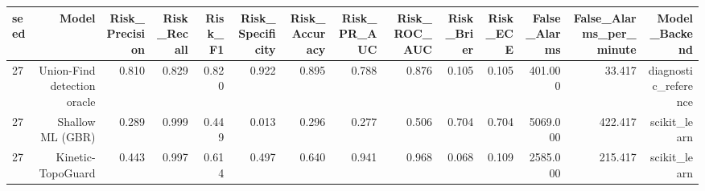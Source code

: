 \begin{tabular}{lrrrrrrrrrrrrr}
\toprule
seed & Model & Risk\_Precision & Risk\_Recall & Risk\_F1 & Risk\_Specificity & Risk\_Accuracy & Risk\_PR\_AUC & Risk\_ROC\_AUC & Risk\_Brier & Risk\_ECE & False\_Alarms & False\_Alarms\_per\_minute & Model\_Backend \\
\midrule
27 & Union-Find detection oracle & 0.810 & 0.829 & 0.820 & 0.922 & 0.895 & 0.788 & 0.876 & 0.105 & 0.105 & 401.000 & 33.417 & diagnostic\_reference \\
27 & Shallow ML (GBR) & 0.289 & 0.999 & 0.449 & 0.013 & 0.296 & 0.277 & 0.506 & 0.704 & 0.704 & 5069.000 & 422.417 & scikit\_learn \\
27 & Kinetic-TopoGuard & 0.443 & 0.997 & 0.614 & 0.497 & 0.640 & 0.941 & 0.968 & 0.068 & 0.109 & 2585.000 & 215.417 & scikit\_learn \\
\bottomrule
\end{tabular}